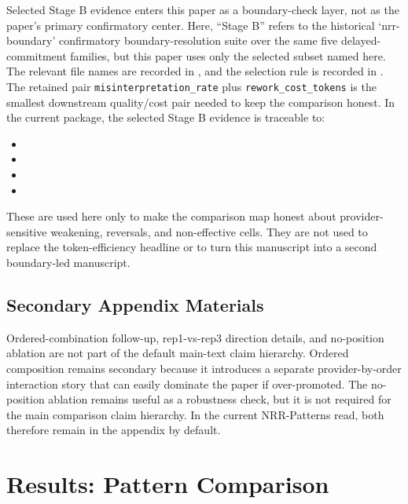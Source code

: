 \documentclass[11pt,a4paper]{article}
\begin{document}
Selected Stage B evidence enters this paper as a boundary-check layer, not as
the paper's primary confirmatory center. Here, ``Stage B'' refers to the
historical `nrr-boundary' confirmatory boundary-resolution suite over the same
five delayed-commitment families, but this paper uses only the selected subset
named here. The relevant file names are recorded in
, and the
selection rule is recorded in
. The
retained pair \texttt{misinterpretation\_rate} plus
\texttt{rework\_cost\_tokens} is the smallest downstream quality/cost pair
needed to keep the comparison honest. In the current package, the selected
Stage B evidence is traceable to:
\begin{itemize}
  \item {}
  \item {}
  \item {}
  \item {}
\end{itemize}
These are used here only to make the comparison map honest about provider-sensitive weakening, reversals, and non-effective cells. They are not used to replace the token-efficiency headline or to turn this manuscript into a second boundary-led manuscript.

\subsection{Secondary Appendix Materials}

Ordered-combination follow-up, rep1-vs-rep3 direction details, and no-position
ablation are not part of the default main-text claim hierarchy. Ordered composition remains
secondary because it introduces a separate provider-by-order interaction story
that can easily dominate the paper if over-promoted. The no-position ablation
remains useful as a robustness check, but it is not required for the main
comparison claim hierarchy. In the current NRR-Patterns read, both therefore
remain in the appendix by default.

\section{Results: Pattern Comparison}
\label{sec:results_comparison}
\end{document}
